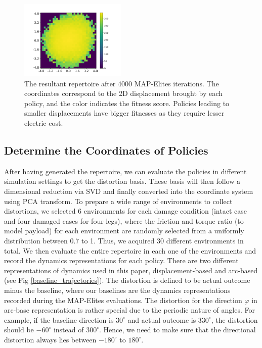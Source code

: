 \begin{figure}[h]
\centering
\includegraphics[width=0.45\textwidth]{original_map_elites.pdf}
\caption{The resultant repertoire after 4000 MAP-Elites iterations.
The coordinates correspond to the 2D displacement brought by each policy, and the color indicates the fitness score.
Policies leading to smaller displacements have bigger fitnesses as they require lesser electric cost.
}
\label{original_repertoire}
\end{figure}









\subsection{Determine the Coordinates of Policies}
After having generated the repertoire, we can evaluate the policies in different simulation settings to get the distortion basis.
These basis will then follow a dimensional reduction via SVD and finally converted into the coordinate system using PCA transform.
To prepare a wide range of environments to collect distortions, we selected 6 environments for each damage condition (intact case and four damaged cases for four legs), where the friction and torque ratio (to model payload) for each environment are randomly selected from a uniformly distribution between 0.7 to 1.
Thus, we acquired 30 different environments in total.
We then evaluate the entire repertoire in each one of the environments and record the dynamics representations for each policy.
There are two different representations of dynamics used in this paper, displacement-based and arc-based (see Fig \ref{baseline_trajectories}). 
The distortion is defined to be actual outcome minus the baseline, where our baselines are the dynamics representations recorded during the MAP-Elites evaluations.
The distortion for the direction $\varphi$ in arc-base representation is rather special due to the periodic nature of angles.
For example, if the baseline direction is $30^{\circ}$ and actual outcome is $330^{\circ}$, the distortion should be $-60^{\circ}$ instead of $300^{\circ}$.
Hence, we need to make sure that the directional distortion always lies between $-180^{\circ}$ to $180^{\circ}$.

